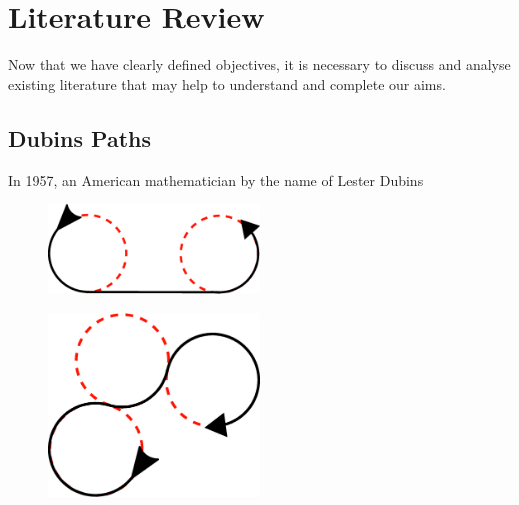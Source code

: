 
\chapter{Literature Review}
\label{litrev}

\graphicspath{{Chapter2/Figs/}}

Now that we have clearly defined objectives, it is necessary to discuss and analyse existing literature that may help to understand and complete our aims.  


\section{Dubins Paths}
\label{litrev:dubins}
In 1957, an American mathematician by the name of Lester Dubins 


\begin{figure}[htbp!] 
\centering    
\includegraphics[width=0.5\textwidth]{LSL}
\caption[Dubins LSL Path]{}
\label{fig:lsl}
\end{figure}

\begin{figure}[htbp!] 
\centering    
\includegraphics[width=0.5\textwidth]{RLR}
\caption[Dubins RLR Path]{}
\label{fig:rlr}
\end{figure}

